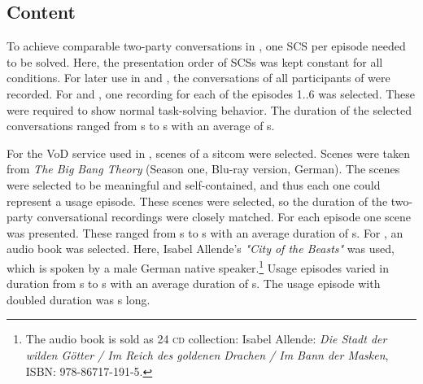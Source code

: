 \subsection{Content}
To achieve comparable two-party conversations in , one \ac{SCS} \citep{itu-t_recommendation_p.805_subjective_2007} per episode needed to be solved.
Here, the presentation order of \acp{SCS} was kept constant for all conditions.
For later use in \EIIa{} and \EIIb{}, the conversations of all participants of  were recorded.
For \EIIa{} and \EIIb{}, one recording for each of the episodes 1..6 was selected.
These were required to show normal task-solving behavior.
The duration of the selected conversations ranged from \unit[128]{s} to \unit[194]{s} with an average of \unit[153]{s}.

For the \ac{VoD} service used in \EIIb{}, scenes of a sitcom were selected.
Scenes were taken from \emph{The Big Bang Theory} (Season one, Blu-ray version, German).
The scenes were selected to be meaningful and self-contained, and thus each one could represent a usage episode.
These scenes were selected, so the duration of the two-party conversational recordings were closely matched.
For each episode one scene was presented.
These ranged from \unit[134]{s} to \unit[198]{s} with an average duration of \unit[166]{s}.
For , an audio book was selected.
Here, Isabel Allende's \emph{"City of the Beasts"} was used, which is spoken by a male German native speaker.\footnote{The audio book is sold as 24 \textsc{\lowercase{CD}} collection: Isabel Allende: \emph{Die Stadt der wilden Götter / Im Reich des goldenen Drachen / Im Bann der Masken}, ISBN: 978-86717-191-5.}
Usage episodes varied in duration from \unit[174]{s} to \unit[199]{s} with an average duration of \unit[184]{s}.
The usage episode with doubled duration was \unit[362]{s} long.

